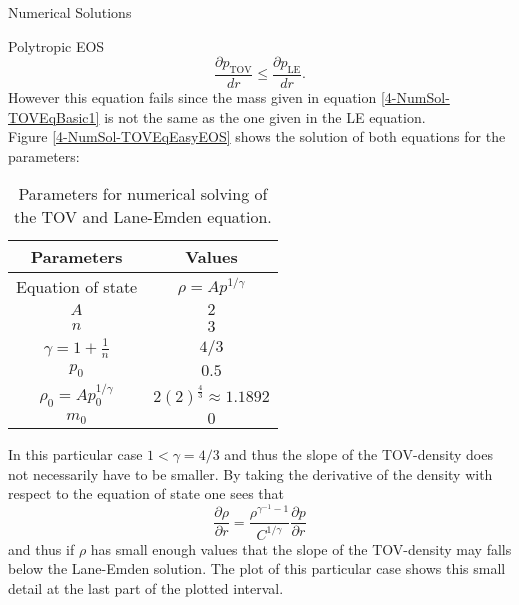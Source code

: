 \begin{section}{Numerical Solutions}
\begin{subsection}{Polytropic EOS}
\begin{equation}
	\frac{\partial p_{\text{TOV}}}{dr} \leq \frac{\partial p_{\text{LE}}}{dr}.
\end{equation}
However this equation fails since the mass given in equation \ref{4-NumSol-TOVEqBasic1} is not the same as the one given in the LE equation.\\
Figure \ref{4-NumSol-TOVEqEasyEOS} shows the solution of both equations for the parameters:
\begin{table}[ht]
	\centering
	\begin{tabular}{|c|c|}
		\hline
		Parameters & Values \\
		\hline
		Equation of state & $\rho=Ap^{1/\gamma}$ \\
		$A$ & $2$\\
		$n$ & $3$\\
		$\gamma=1+\frac{1}{n}$ & $4/3$ \\
		$p_0$ & $0.5$ \\
		$\rho_0=Ap_0^{1/\gamma}$ & $2(2)^{\frac{4}{3}}\approx1.1892$\\
		$m_0$ & $0$\\
		\hline
	\end{tabular}
	\caption[Numerical Parameters for TOV and Lane-Emden equation]{Parameters for numerical solving of the TOV and Lane-Emden equation.}
	\label{4-NumSol-TOVParameters}
\end{table}
In this particular case $1<\gamma=4/3$ and thus the slope of the TOV-density does not necessarily have to be smaller. By taking the derivative of the density with respect to the equation of state one sees that
\begin{equation}
	\frac{\partial\rho}{\partial r} = \frac{\rho^{\gamma^{-1}-1}}{C^{1/\gamma}}\frac{\partial p}{\partial r}
\end{equation}
and thus if $\rho$ has small enough values that the slope of the TOV-density may falls below the Lane-Emden solution. The plot of this particular case shows this small detail at the last part of the plotted interval.
\begin{figure}[ht]

\end{figure}
\end{subsection}
\end{section}
